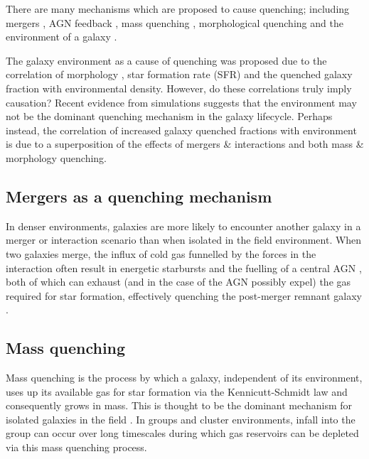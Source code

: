 \documentclass[useAMS,usenatbib]{mn2e}
\begin{document}
 There are many mechanisms which are proposed to cause quenching; including mergers \citep{daddi10, darg10b, cheung12, barro13, pontzen16}, AGN feedback \citep{dimatteo05, nandra07}, mass quenching \citep{peng12}, morphological quenching \citep{fang13} and the environment of a galaxy \citep[see review of mechanisms in][and references therein]{boselli06}.
 
 The galaxy environment as a cause of quenching was proposed due to the correlation of morphology \citep{dressler80, smail97, poggianti99, postman05, bamford09}, star formation rate (SFR) and the quenched galaxy fraction \citep{kauffmann03, baldry06, peng12, darvish16} with environmental density. However, do these correlations truly imply causation? Recent evidence from simulations suggests that the environment may not be the dominant quenching mechanism in the galaxy lifecycle. Perhaps instead, the correlation of increased galaxy quenched fractions with environment is due to a superposition of the effects of mergers \& interactions and both mass \& morphology quenching. 
 
\subsection{Mergers as a quenching mechanism}
In denser environments, galaxies are more likely to encounter another galaxy in a merger or interaction scenario than when isolated in the field environment. When two galaxies merge, the influx of cold gas funnelled by the forces in the interaction often result in energetic starbursts and the fuelling of a central AGN \citep{hopkins05}, both of which can exhaust  (and in the case of the AGN possibly expel) the gas required for star formation, effectively quenching the post-merger remnant galaxy \citep{pontzen16}. 

\subsection{Mass quenching}
Mass quenching is the process by which a galaxy, independent of its environment, uses up its available gas for star formation via the Kennicutt-Schmidt law \citep{schmidt59, kennicutt98} and consequently grows in mass. This is thought to be the dominant mechanism for isolated galaxies in the field \citep{kormendy04}. In groups and cluster environments, infall into the group can occur over long timescales during which gas reservoirs can be depleted via this mass quenching process.
 
\end{document}

